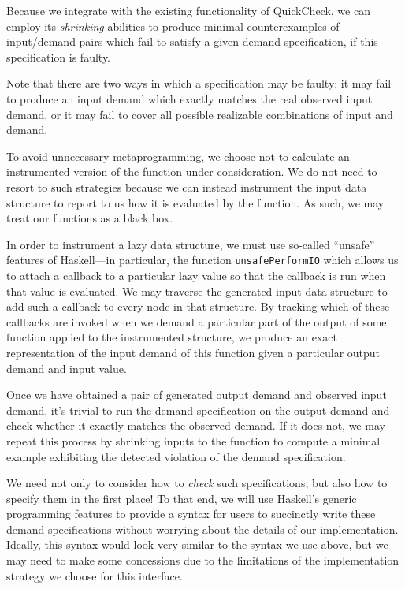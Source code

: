\documentclass{article}
\begin{document}
Because we integrate with the existing functionality of QuickCheck, we can
employ its \emph{shrinking} abilities to produce minimal counterexamples of
input/demand pairs which fail to satisfy a given demand specification, if this
specification is faulty.

Note that there are two ways in which a specification may be faulty: it may fail
to produce an input demand which exactly matches the real observed input demand,
or it may fail to cover all possible realizable combinations of input and
demand.

To avoid unnecessary metaprogramming, we choose not to calculate an instrumented
version of the function under consideration. We do not need to resort to such
strategies because we can instead instrument the input data structure to report
to us how it is evaluated by the function. As such, we may treat our functions
as a black box.

In order to instrument a lazy data structure, we must use so-called ``unsafe''
features of Haskell---in particular, the function \verb|unsafePerformIO| which
allows us to attach a callback to a particular lazy value so that the callback
is run when that value is evaluated. We may traverse the generated input data
structure to add such a callback to every node in that structure. By tracking
which of these callbacks are invoked when we demand a particular part of the
output of some function applied to the instrumented structure, we produce an
exact representation of the input demand of this function given a particular
output demand and input value.

Once we have obtained a pair of generated output demand and observed input
demand, it's trivial to run the demand specification on the output demand and
check whether it exactly matches the observed demand. If it does not, we may
repeat this process by shrinking inputs to the function to compute a minimal
example exhibiting the detected violation of the demand specification.

We need not only to consider how to \emph{check} such specifications, but also
how to specify them in the first place! To that end, we will use Haskell's
generic programming features to provide a syntax for users to succinctly write
these demand specifications without worrying about the details of our
implementation. Ideally, this syntax would look very similar to the syntax we
use above, but we may need to make some concessions due to the limitations of
the implementation strategy we choose for this interface.
\end{document}
